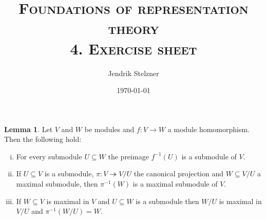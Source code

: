 \documentclass[a4paper,10pt]{article}
\title{\textsc{Foundations of representation theory \\ \Large 4. Exercise sheet}}
\author{Jendrik Stelzner}
\date{\today}
\theoremstyle{definition}
\newtheorem{lem}[own]{Lemma}
\begin{document}
\maketitle





\section{}





\section{}


\begin{lem}\label{lem:cool}
 Let $V$ and $W$ be modules and $f : V \rightarrow W$ a module homomorphism. Then the following hold:
 \begin{enumerate}[i)]
  \item For every submodule $U \subseteq W$ the preimage $f^{-1}(U)$ is a submodule of $V$. \label{lem:urbild}
  \item If $U \subseteq V$ is a submodule, $\pi : V \twoheadrightarrow V\!/U$ the canonical projection and $W \subseteq V\!/U$ a maximal submodule, then $\pi^{-1}(W)$ is a maximal submodule of $V$. \label{lem:urbildmax}
  \item If $W \subseteq V$ is maximal in $V$ and $U \subseteq W$ is a submodule then $W\!/U$ is maximal in $V\!/U$ and $\pi^{-1}(W\!/U) = W$. \label{lem:bildmax}
 \end{enumerate}
\end{lem}
\end{document}
